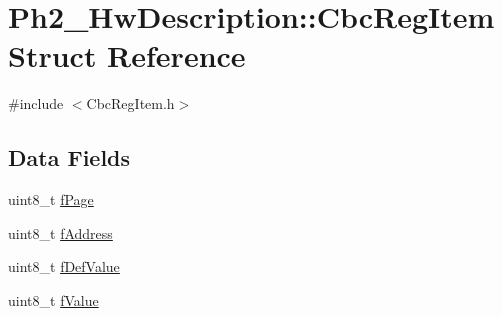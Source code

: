 \hypertarget{struct_ph2___hw_description_1_1_cbc_reg_item}{\section{Ph2\-\_\-\-Hw\-Description\-:\-:Cbc\-Reg\-Item Struct Reference}
\label{struct_ph2___hw_description_1_1_cbc_reg_item}
}


{\ttfamily \#include $<$Cbc\-Reg\-Item.\-h$>$}

\subsection*{Data Fields}
\begin{DoxyCompactItemize}
\item 
uint8\-\_\-t \hyperlink{struct_ph2___hw_description_1_1_cbc_reg_item_a082fb29397d4a4e2ccbf4563c1385e6e}{f\-Page}
\item 
uint8\-\_\-t \hyperlink{struct_ph2___hw_description_1_1_cbc_reg_item_a67f6d52003832c42c7747f304d50a87d}{f\-Address}
\item 
uint8\-\_\-t \hyperlink{struct_ph2___hw_description_1_1_cbc_reg_item_a7c958bb4e0cd79891f3d3a191ef2f749}{f\-Def\-Value}
\item 
uint8\-\_\-t \hyperlink{struct_ph2___hw_description_1_1_cbc_reg_item_a1fa052a53215cbee674174febcc52b6a}{f\-Value}
\end{DoxyCompactItemize}


